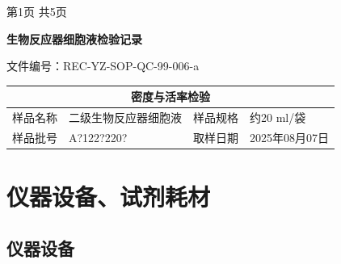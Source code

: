 \documentclass[UTF8,10pt,a4paper,fontset=fandol]{ctexart}
\newcommand{\fieldvalue}[1]{#1}
\newcommand{\handwritten}[1]{#1}
\begin{document}
\noindent
第1页 共5页

\newpage

\begin{center}
\textbf{生物反应器细胞液检验记录}
\end{center}

\noindent 文件编号：REC-YZ-SOP-QC-99-006-a

\begin{center}
\begin{tabular}{|p{2.5cm}|p{5.2cm}|p{2.5cm}|p{3.5cm}|}
\hline
\multicolumn{4}{|c|}{密度与活率检验} \\
\hline
样品名称 &
\fieldvalue{\handwritten{二级生物反应器细胞液}} &
样品规格 &
\fieldvalue{\handwritten{约20}} ml/袋 \\
\hline
样品批号 &
\fieldvalue{\handwritten{A?122?220?}} &
取样日期 &
2025年08月07日 \\
\hline
\end{tabular}
\end{center}

\section{仪器设备、试剂耗材}

\subsection{仪器设备}
\end{document}
